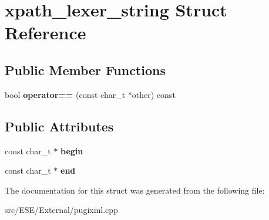 \hypertarget{structxpath__lexer__string}{\section{xpath\-\_\-lexer\-\_\-string Struct Reference}
\label{structxpath__lexer__string}
}
\subsection*{Public Member Functions}
\begin{DoxyCompactItemize}
\item 
\hypertarget{structxpath__lexer__string_ac19adfd75832be8eff3f430aa3cb3c14}{bool {\bfseries operator==} (const char\-\_\-t $\ast$other) const }\label{structxpath__lexer__string_ac19adfd75832be8eff3f430aa3cb3c14}

\end{DoxyCompactItemize}
\subsection*{Public Attributes}
\begin{DoxyCompactItemize}
\item 
\hypertarget{structxpath__lexer__string_a0b985863d7363a75d4fdd0a7ece1fca0}{const char\-\_\-t $\ast$ {\bfseries begin}}\label{structxpath__lexer__string_a0b985863d7363a75d4fdd0a7ece1fca0}

\item 
\hypertarget{structxpath__lexer__string_a13bbedeca2f8c2fb1e294325eea66878}{const char\-\_\-t $\ast$ {\bfseries end}}\label{structxpath__lexer__string_a13bbedeca2f8c2fb1e294325eea66878}

\end{DoxyCompactItemize}


The documentation for this struct was generated from the following file\-:\begin{DoxyCompactItemize}
\item 
src/\-E\-S\-E/\-External/pugixml.\-cpp\end{DoxyCompactItemize}
